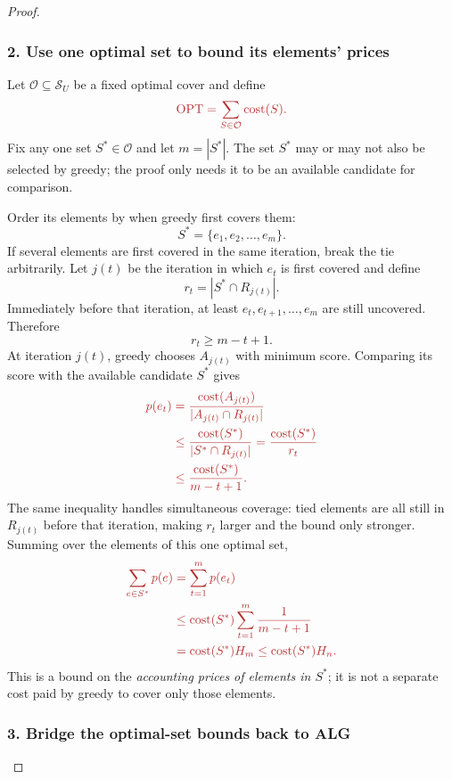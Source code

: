 \documentclass[10pt]{article}
\theoremstyle{definition}
\newcommand{\OPT}{\operatorname{OPT}}
\begin{document}
\begin{proof}
\subsubsection*{\textcolor{optred}{2. Use one optimal set to bound its elements' prices}}

Let $\mathcal{O}\subseteq\mathcal{S}_U$ be a fixed optimal cover and define
\[
  \color{optred}
  \OPT=\sum_{S\in\mathcal{O}}\operatorname{cost}(S).
\]
Fix any one set $S^*\in\mathcal{O}$ and let $m=|S^*|$. The set $S^*$ may or
may not also be selected by greedy; the proof only needs it to be an available
candidate for comparison.

Order its elements by when greedy first covers them:
\[
  S^*=\{e_1,e_2,\ldots,e_m\}.
\]
If several elements are first covered in the same iteration, break the tie
arbitrarily. Let $j(t)$ be the iteration in which $e_t$ is first covered and
define
\[
  r_t=|S^*\cap R_{j(t)}|.
\]
Immediately before that iteration, at least
$e_t,e_{t+1},\ldots,e_m$ are still uncovered. Therefore
\[
  r_t\geq m-t+1.
\]
At iteration $j(t)$, greedy chooses $A_{j(t)}$ with minimum score. Comparing
its score with the available candidate $S^*$ gives
\[
  \color{optred}
  \begin{aligned}
  p(e_t)
  &=\frac{\operatorname{cost}(A_{j(t)})}
          {|A_{j(t)}\cap R_{j(t)}|}\\
  &\leq\frac{\operatorname{cost}(S^*)}{|S^*\cap R_{j(t)}|}
   =\frac{\operatorname{cost}(S^*)}{r_t}\\
  &\leq\frac{\operatorname{cost}(S^*)}{m-t+1}.
  \end{aligned}
\]
The same inequality handles simultaneous coverage: tied elements are all
still in $R_{j(t)}$ before that iteration, making $r_t$ larger and the bound
only stronger. Summing over the elements of this one optimal set,
\[
  \color{optred}
  \begin{aligned}
  \sum_{e\in S^*}p(e)
  &=\sum_{t=1}^{m}p(e_t)\\
  &\leq\operatorname{cost}(S^*)
    \sum_{t=1}^{m}\frac1{m-t+1}\\
  &=\operatorname{cost}(S^*)H_m
   \leq\operatorname{cost}(S^*)H_n.
  \end{aligned}
\]
This is a bound on the \emph{accounting prices of elements in $S^*$}; it is
not a separate cost paid by greedy to cover only those elements.

\subsubsection*{\textcolor{bridgepurple}{3. Bridge the optimal-set bounds back to ALG}}


\end{proof}
\end{document}
